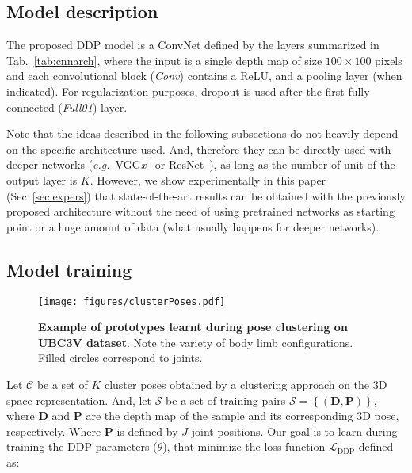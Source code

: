 \documentclass[review,12pt,3p]{elsarticle}
\def \eg{\textit{e.g.}}
\begin{document}
\subsection{Model description}\label{subsec:archit}

The proposed DDP model is a ConvNet defined by the layers summarized in Tab.~\ref{tab:cnnarch}, where the input is a single depth map of size $100\times 100$ pixels and each convolutional block (\textit{Conv}) contains a ReLU, and a pooling layer (when indicated). For regularization purposes, dropout is used after the first fully-connected (\textit{Full01}) layer.


Note that the ideas described in the following subsections do not heavily depend on the specific architecture used. And, therefore they can be directly used with deeper networks (\eg~VGG\textit{x}~\cite{simonyan2014very} or ResNet~\cite{he2016resnet}), as long as the number of unit of the output layer is $K$. However, we show experimentally in this paper (Sec~\ref{sec:expers}) that state-of-the-art results can be obtained with the previously proposed architecture without the need of using pretrained networks as starting point or a huge amount of data (what usually happens for deeper networks).



\subsection{Model training}\label{subsec:DDPtrain}
\begin{figure*}[b]
\centering
   \texttt{[image: figures/clusterPoses.pdf]}
   \caption{\textbf{Example of prototypes learnt during pose clustering on UBC3V dataset}. Note the variety of body limb configurations. Filled circles correspond to joints.
   }
   \label{fig:clusterPoses}
\end{figure*}
Let $\mathcal{C}$ be a set of $K$ cluster poses obtained by a clustering approach on the 3D space representation. And,
let $\mathcal{S}$ be a set of training pairs $\mathcal{S} = \left\{ (\mathbf{D}, \mathbf{P})  \right\}$,
where $\mathbf{D}$ and $\mathbf{P}$ are the depth map of the sample and its corresponding 3D pose, respectively. Where $\mathbf{P}$ is defined by $J$ joint positions. %
Our goal is to learn during training the DDP parameters ($\theta$), that minimize the loss function $\mathcal{L}_{\text{DDP}}$ defined as:
\end{document}
